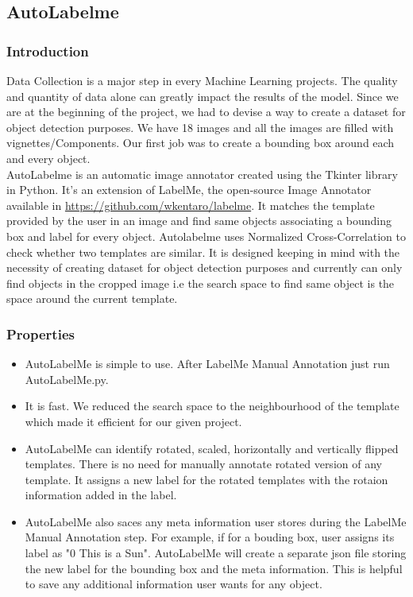 \documentclass[12pt]{article}
\begin{document}
\subsection{AutoLabelme}
\subsubsection{Introduction}
Data Collection is a major step in every Machine Learning projects. The quality and quantity of data alone can greatly impact the results of the model. Since we are at the beginning of the project, we had to devise a way to create a dataset for object detection purposes. We have 18 images and all the images are filled with vignettes/Components. Our first job was to create a bounding box around each and every object.\\
AutoLabelme is an automatic image annotator created using the Tkinter library in Python. It's an extension of LabelMe, the open-source Image Annotator available in \href{https://github.com/wkentaro/labelme}{https://github.com/wkentaro/labelme}. It matches the template provided by the user in an image and find same objects associating a bounding box and label for every object.
Autolabelme uses Normalized Cross-Correlation to check whether two templates are similar. It is designed keeping in mind with the necessity of creating dataset for object detection purposes and currently can only find objects in the cropped image i.e the search space to find same object is the space around the current template.
\subsubsection{Properties}
\begin{itemize}
    \item AutoLabelMe is simple to use. After LabelMe Manual Annotation just run AutoLabelMe.py.
    \item It is fast. We reduced the search space to the neighbourhood of the template which made it efficient for our given project.
    \item AutoLabelMe can identify rotated, scaled, horizontally and vertically flipped templates. There is no need for manually annotate rotated version of any template. It assigns a new label for the rotated templates with the rotaion information added in the label.
    \item AutoLabelMe also saces any meta information user stores during the LabelMe Manual Annotation step. For example, if for a bouding box, user assigns its label as "0 This is a Sun". AutoLabelMe will create a separate json file storing the new label for the bounding box and the meta information. This is helpful to save any additional information user wants for any object.
\end{itemize}
\end{document}
